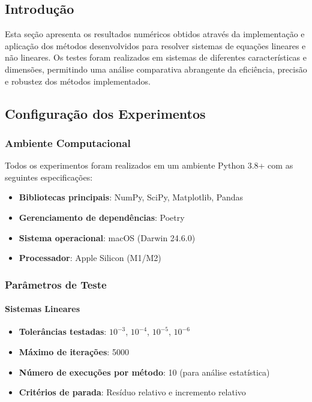 \documentclass[12pt,a4paper]{article}
\begin{document}
\subsection{Introdução}
Esta seção apresenta os resultados numéricos obtidos através da implementação e aplicação dos métodos desenvolvidos para resolver sistemas de equações lineares e não lineares. Os testes foram realizados em sistemas de diferentes características e dimensões, permitindo uma análise comparativa abrangente da eficiência, precisão e robustez dos métodos implementados.

\subsection{Configuração dos Experimentos}

\subsubsection{Ambiente Computacional}
Todos os experimentos foram realizados em um ambiente Python 3.8+ com as seguintes especificações:
\begin{itemize}
    \item \textbf{Bibliotecas principais}: NumPy, SciPy, Matplotlib, Pandas
    \item \textbf{Gerenciamento de dependências}: Poetry
    \item \textbf{Sistema operacional}: macOS (Darwin 24.6.0)
    \item \textbf{Processador}: Apple Silicon (M1/M2)
\end{itemize}

\subsubsection{Parâmetros de Teste}
\paragraph{Sistemas Lineares}
\begin{itemize}
    \item \textbf{Tolerâncias testadas}: $10^{-3}$, $10^{-4}$, $10^{-5}$, $10^{-6}$
    \item \textbf{Máximo de iterações}: 5000
    \item \textbf{Número de execuções por método}: 10 (para análise estatística)
    \item \textbf{Critérios de parada}: Resíduo relativo e incremento relativo
\end{itemize}
\end{document}
